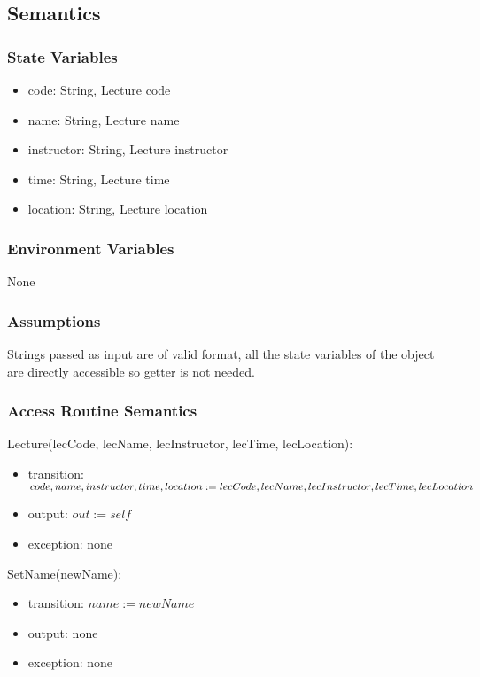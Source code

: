 \documentclass[12pt, titlepage]{article}
\begin{document}
\subsection{Semantics}

\subsubsection{State Variables}

\begin{itemize}
\item code: String, Lecture code
\item name: String, Lecture name
\item instructor: String, Lecture instructor
\item time: String, Lecture time
\item location: String, Lecture location
\end{itemize}

\subsubsection{Environment Variables}

None

\subsubsection{Assumptions}

Strings passed as input are of valid format, all the state variables of the object are directly accessible so getter is not needed.

\subsubsection{Access Routine Semantics}

\noindent Lecture(lecCode, lecName, lecInstructor, lecTime, lecLocation):
\begin{itemize}
\item transition: $code, name, instructor, time, location := \\ lecCode, lecName, lecInstructor, lecTime, lecLocation$
\item output: $out := self$
\item exception: none
\end{itemize}

\noindent SetName(newName):
\begin{itemize}
\item transition: $name := newName$
\item output: none
\item exception: none
\end{itemize}
\end{document}
